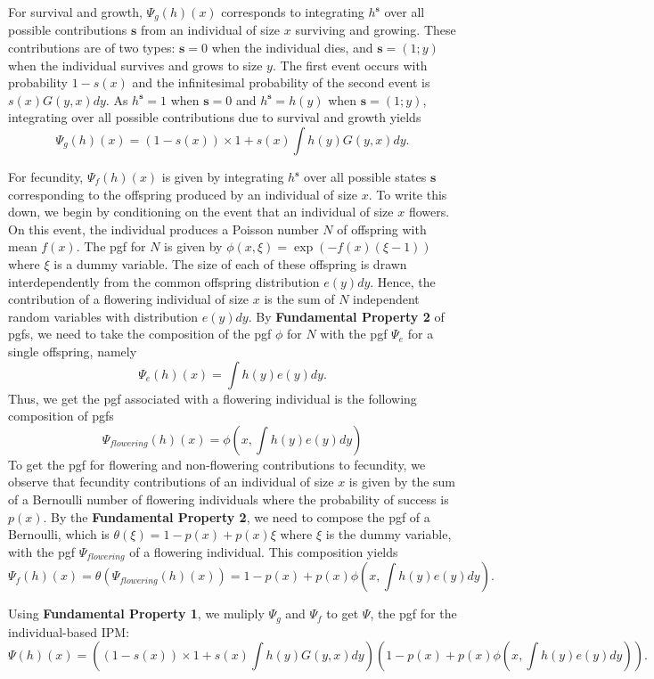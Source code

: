 \documentclass[12pt]{amsart}\usepackage[]{graphicx}\usepackage[]{color}
\def\s{\mathbf s}
\begin{document}
For survival and growth, $\Psi_g(h)(x)$ corresponds to integrating $h^\s$ over all possible contributions $\s$ from an individual of size $x$ surviving and growing. These contributions are of two types: $\s=0$ when the individual dies,  and $\s=(1;y)$ when the individual survives and grows to size $y$. The first event occurs with probability $1-s(x)$ and the infinitesimal probability of the second event is $s(x)G(y, x)dy$. As $h^\s=1$ when $\s=0$ and $h^\s=h(y)$ when $\s=(1;y)$, integrating over all possible contributions due to survival and growth yields
\[
\Psi_{g}(h)(x)=(1-s(x))\times 1 + s(x)\int h(y)G(y, x)dy.
\]

For fecundity, $\Psi_f(h)(x)$ is given by integrating $h^\s$ over all possible states $\s$ corresponding to the offspring produced by an individual of size $x$.  To write this down, we begin by conditioning on the event that an individual of size $x$ flowers. On this event, the individual produces a Poisson number $N$ of offspring with mean $f(x)$. The pgf for $N$ is given by $\phi(x, \xi)=\exp(-f(x)(\xi-1))$ where $\xi$ is a dummy variable. The size of each of these offspring is drawn interdependently from the common offspring distribution $e(y)dy$. Hence, the contribution of a flowering individual of size $x$ is the sum of $N$ independent random variables with distribution $e(y)dy$. By \textbf{Fundamental Property 2} of pgfs, we need to take the composition of the pgf $\phi$ for $N$ with the pgf $\Psi_e$ for a single offspring, namely
\[
\Psi_e(h)(x)=\int h(y)e(y)dy.
\]
Thus, we get the pgf associated with a flowering individual is the following composition of pgfs
\[
\Psi_{flowering}(h)(x)=\phi(x, \int h(y)e(y)dy)
\]
To get the pgf for flowering and non-flowering contributions to fecundity, we observe that fecundity contributions of an individual of size $x$ is given by the sum of a Bernoulli number of flowering individuals where the probability of success is $p(x)$. By the \textbf{Fundamental Property 2}, we need to compose the pgf of a Bernoulli, which is $\theta(\xi)=1-p(x)+p(x)\xi$ where $\xi$ is the dummy variable, with the pgf $\Psi_{flowering}$ of a flowering individual. This composition yields
\[
\Psi_f (h)(x)=\theta(\Psi_{flowering}(h)(x))=1-p(x)+p(x)\phi(x, \int h(y)e(y)dy).
\]


Using \textbf{Fundamental Property 1}, we muliply $\Psi_g$ and $\Psi_f$ to get $\Psi$, the pgf for the individual-based IPM:
\[
\Psi(h)(x)=\left((1-s(x))\times 1 + s(x)\int h(y)G(y, x)dy\right)\left(1-p(x)+p(x)\phi(x, \int h(y)e(y)dy)\right).
\]
\end{document}
